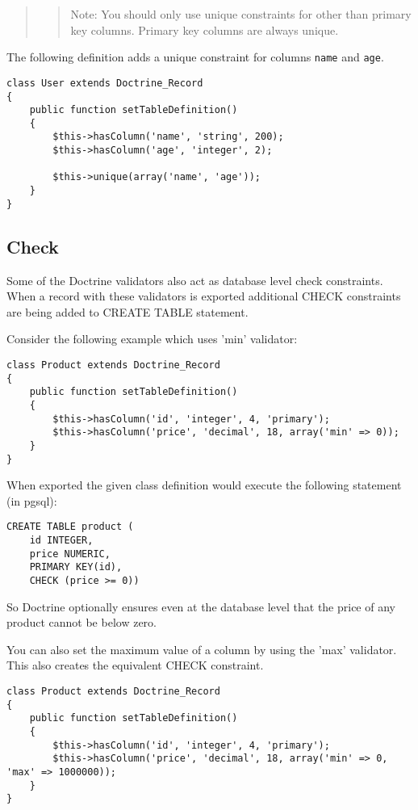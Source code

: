 \documentclass[11pt,a4paper]{report}
\begin{document}
\begin{quote}
\begin{quote}
Note: You should only use unique constraints for other than primary key columns. Primary key columns are always unique.\end{quote}

\end{quote}

The following definition adds a unique constraint for columns \texttt{name} and \texttt{age}.

\begin{verbatim}
class User extends Doctrine_Record
{
    public function setTableDefinition()
    {
        $this->hasColumn('name', 'string', 200);
        $this->hasColumn('age', 'integer', 2);

        $this->unique(array('name', 'age'));
    }
}
\end{verbatim}

\subsection{Check}
Some of the Doctrine validators also act as database level check constraints. When a record with these validators is exported additional CHECK constraints are being added to CREATE TABLE statement.

Consider the following example which uses 'min' validator:

\begin{verbatim}
class Product extends Doctrine_Record
{
    public function setTableDefinition()
    {
        $this->hasColumn('id', 'integer', 4, 'primary');
        $this->hasColumn('price', 'decimal', 18, array('min' => 0));
    }
}
\end{verbatim}

When exported the given class definition would execute the following statement (in pgsql):

\begin{verbatim}
CREATE TABLE product (
    id INTEGER,
    price NUMERIC,
    PRIMARY KEY(id),
    CHECK (price >= 0))
\end{verbatim}

So Doctrine optionally ensures even at the database level that the price of any product cannot be below zero.

You can also set the maximum value of a column by using the 'max' validator. This also creates the equivalent CHECK constraint.

\begin{verbatim}
class Product extends Doctrine_Record
{
    public function setTableDefinition()
    {
        $this->hasColumn('id', 'integer', 4, 'primary');
        $this->hasColumn('price', 'decimal', 18, array('min' => 0, 'max' => 1000000));
    }
}
\end{verbatim}
\end{document}
